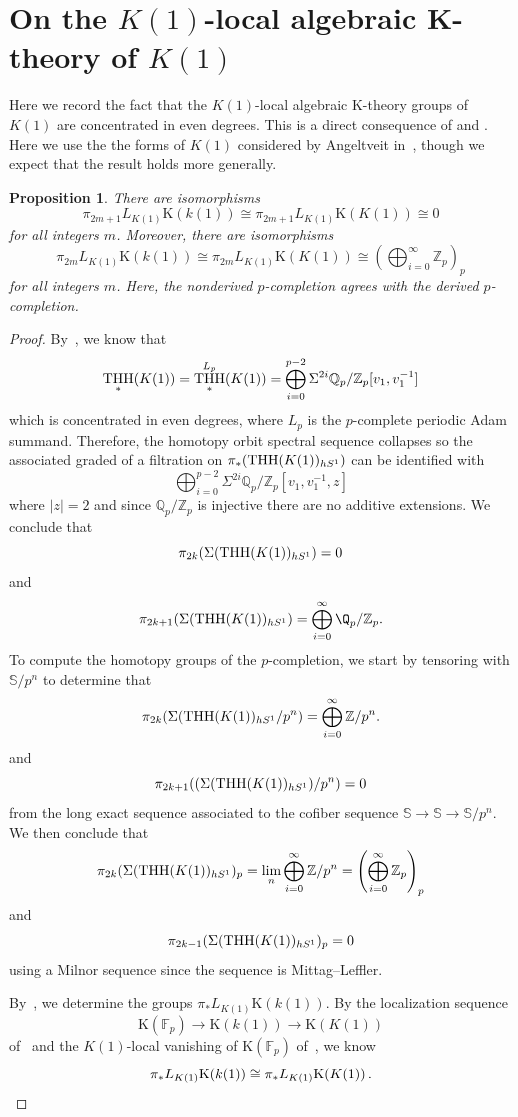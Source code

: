 \documentclass[english,10pt]{amsart}
\newtheorem{prop}{Proposition}[section]
\theoremstyle{definition}
\numberwithin{equation}{section}
\DeclareMathOperator{\thh}{\ensuremath{\textup{THH}}}
\newcommand{\THH}{\thh}
\newcommand{\pis}{\pi_*}
\begin{document}
\section{On the \texorpdfstring{$K(1)$}{K(1)}-local algebraic K-theory of \texorpdfstring{$K(1)$}{K(1)}}\label{K1local}
Here we record the fact that the $K(1)$-local algebraic K-theory groups of $K(1)$ are concentrated in even degrees. This is a direct consequence of \cite{angeltveit2008thhofainftyringspectra} and \cite{DR25}. Here we use the the forms of $K(1)$ considered by Angeltveit in~\cite[Theorem~5.17]{angeltveit2008thhofainftyringspectra}, though we expect that the result holds more generally. 
\begin{prop}\label{even K(1)-local}
There are isomorphisms
\[  \pi_{2m+1}L_{K(1)}\mathrm{K}(k(1))\cong \pi_{2m+1}L_{K(1)}\mathrm{K}(K(1))\cong 0\]
for all integers $m$. Moreover, there are isomorphisms 
\[  
\pi_{2m}L_{K(1)}\mathrm{K}(k(1)) \cong \pi_{2m}L_{K(1)}\mathrm{K}(K(1)) \cong \left (\bigoplus_{i=0}^{\infty}\mathbb{Z}_p \right )_p
\] 
for all integers $m$. Here, the nonderived $p$-completion agrees with the derived $p$-completion.  
\end{prop}
\begin{proof}
By~\cite[Theorem~5.16,~pp.~1025--1026]{angeltveit2008thhofainftyringspectra}, we know that 
\[ 
\THH_*(K(1))=\THH_*^{L_p}(K(1))=\bigoplus_{i=0}^{p-2}\Sigma^{2i}\mathbb{Q}_p/\mathbb{Z}_p[v_1,v_1^{-1}]
\]
which is concentrated in even degrees, where $L_p$ is the $p$-complete periodic Adam summand. Therefore, the homotopy orbit spectral sequence collapses so the associated graded of a filtration on $\pis (\THH(K(1))_{hS^1})$ can be identified with 
\[ \bigoplus_{i=0}^{p-2}\Sigma^{2i}\mathbb{Q}_p/\mathbb{Z}_p[v_1,v_1^{-1},z]
\]
where $|z|=2$ and since $\mathbb{Q}_p/\mathbb{Z}_p$ is injective there are no additive extensions. We conclude that
\[ 
\pi_{2k}(\Sigma(\THH(K(1))_{hS^1})=0
\]
and 
\[ 
\pi_{2k+1}(\Sigma(\THH(K(1))_{hS^1})= \bigoplus_{i=0}^{\infty} \Q_p/\mathbb{Z}_p . 
\]
To compute the homotopy groups of the $p$-completion, we start by tensoring with $\mathbb{S}/p^n$ to determine that 
\[ 
\pi_{2k}(\Sigma(\THH(K(1))_{hS^1}/p^n)=\bigoplus_{i=0}^{\infty} \mathbb{Z}/p^n . 
\]
and 
\[ 
\pi_{2k+1}((\Sigma(\THH(K(1))_{hS^1})/p^n)=0
\]
from the long exact sequence associated to the cofiber sequence $\mathbb{S}\to\mathbb{S}\to \mathbb{S}/p^n$. We then conclude that  \[ 
\pi_{2k}(\Sigma(\THH(K(1))_{hS^1})_p=\lim_n \bigoplus_{i=0}^{\infty} \mathbb{Z}/p^n = \left ( \bigoplus_{i=0}^{\infty} \mathbb{Z}_p \right )_p 
\]
and
\[ 
\pi_{2k-1}(\Sigma(\THH(K(1))_{hS^1})_p=0
\]
using a Milnor sequence since the sequence is Mittag--Leffler. 

By~\cite[Theorem~0.4.2]{DR25}, we determine the groups $\pi_*L_{K(1)}\mathrm{K}(k(1))$. By the localization sequence 
\[
\mathrm{K}(\mathbb{F}_p)\to \mathrm{K}(k(1)) \to \mathrm{K}(K(1)) \]
of~\cite{BM08,AGH19} and the $K(1)$-local vanishing of $\mathrm{K}(\mathbb{F}_p)$ of~\cite{Qui72}, we know 
\[
\pi_*L_{K(1)}\mathrm{K}(k(1))\cong \pi_*L_{K(1)}\mathrm{K}(K(1)) \,. \qedhere
\] 
\end{proof}
\end{document}
